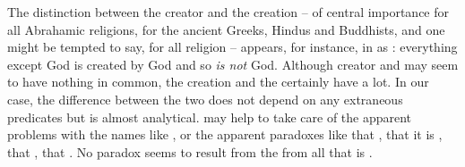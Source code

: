 {%
  The distinction between the creator and the creation -- of central importance
  for all Abrahamic religions, for the ancient Greeks, Hindus and Buddhists, and
  one might be tempted to say, for all religion -- appears, for instance, in
  \citeauthor*{Sokolowski}{} as : everything except
  God is created by God and so {\em is not} God. Although creator and
   may seem to have nothing in common, the creation and the
   certainly have a lot. In our case, the difference between
  the two does not depend on any extraneous predicates but is almost
  analytical.   may help to take care of the
  apparent problems with the names like , or the apparent
  paradoxes like that , that it is
  ,
  that , that .  No paradox
  seems to result from  the  from all that is
  .}


